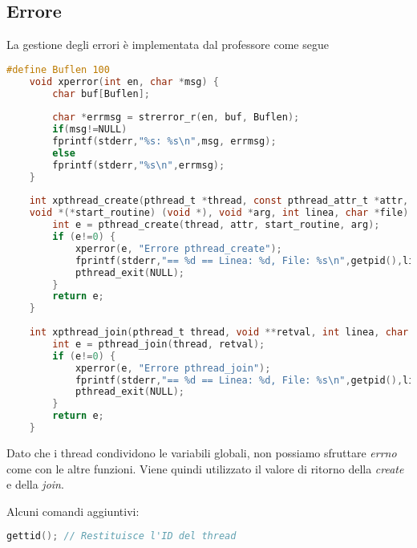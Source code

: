 \subsection{Errore}
La gestione degli errori è implementata dal professore come segue
\begin{lstlisting}[language=C]
	#define Buflen 100
	void xperror(int en, char *msg) {
		char buf[Buflen];
		
		char *errmsg = strerror_r(en, buf, Buflen);
		if(msg!=NULL)
		fprintf(stderr,"%s: %s\n",msg, errmsg);
		else
		fprintf(stderr,"%s\n",errmsg);
	}
	
	int xpthread_create(pthread_t *thread, const pthread_attr_t *attr,
	void *(*start_routine) (void *), void *arg, int linea, char *file) {
		int e = pthread_create(thread, attr, start_routine, arg);
		if (e!=0) {
			xperror(e, "Errore pthread_create");
			fprintf(stderr,"== %d == Linea: %d, File: %s\n",getpid(),linea,file);
			pthread_exit(NULL);
		}
		return e;                       
	}
	
	int xpthread_join(pthread_t thread, void **retval, int linea, char *file) {
		int e = pthread_join(thread, retval);
		if (e!=0) {
			xperror(e, "Errore pthread_join");
			fprintf(stderr,"== %d == Linea: %d, File: %s\n",getpid(),linea,file);
			pthread_exit(NULL);
		}
		return e;
	}
\end{lstlisting}
Dato che i thread condividono le variabili globali, non possiamo sfruttare \emph{errno} come con le altre funzioni. Viene quindi utilizzato il valore di ritorno della \emph{create} e della \emph{join}.

\begin{note}
	Alcuni comandi aggiuntivi:
	\begin{lstlisting}[language=C]
		gettid(); // Restituisce l'ID del thread
	\end{lstlisting}
\end{note}

